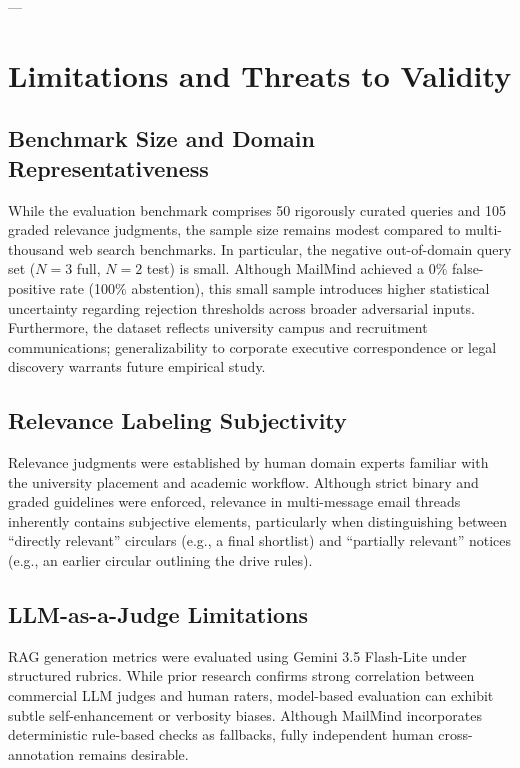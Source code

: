 \documentclass[11pt,a4paper]{article}
\begin{document}
---

\section{Limitations and Threats to Validity}

\subsection{Benchmark Size and Domain Representativeness}
While the evaluation benchmark comprises 50 rigorously curated queries and 105 graded relevance judgments, the sample size remains modest compared to multi-thousand web search benchmarks. In particular, the negative out-of-domain query set ($N=3$ full, $N=2$ test) is small. Although MailMind achieved a 0\% false-positive rate (100\% abstention), this small sample introduces higher statistical uncertainty regarding rejection thresholds across broader adversarial inputs. Furthermore, the dataset reflects university campus and recruitment communications; generalizability to corporate executive correspondence or legal discovery warrants future empirical study.

\subsection{Relevance Labeling Subjectivity}
Relevance judgments were established by human domain experts familiar with the university placement and academic workflow. Although strict binary and graded guidelines were enforced, relevance in multi-message email threads inherently contains subjective elements, particularly when distinguishing between ``directly relevant'' circulars (e.g., a final shortlist) and ``partially relevant'' notices (e.g., an earlier circular outlining the drive rules).

\subsection{LLM-as-a-Judge Limitations}
RAG generation metrics were evaluated using Gemini 3.5 Flash-Lite under structured rubrics. While prior research \cite{zheng2023judging} confirms strong correlation between commercial LLM judges and human raters, model-based evaluation can exhibit subtle self-enhancement or verbosity biases. Although MailMind incorporates deterministic rule-based checks as fallbacks, fully independent human cross-annotation remains desirable.
\end{document}
